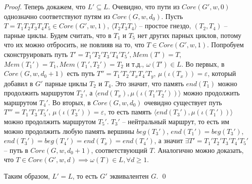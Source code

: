\begin{proof}
    Теперь докажем, что $L' \subseteq L$. 
    Очевидно, что пути из $Core(G', w, 0)$ однозначно соответствуют путям из $Core(G, w, d_0)$. 
    Пусть $T = T_1 T_2 T_3 T_4 T_5 \in Core(G', w, 1)$, 
    $\langle T_2 T_3 T_4 \rangle$ -- простое гнездо, $(T_2, T_4)$ -- парные циклы.
    Будем считать, что в $T_1$ и $T_5$ нет других парных циклов,
    потому что их можно отбросить, не повлияв на то, что $T \in Core(G',w,1)$. 
    Попробуем сконструировать путь $T' = T_1' T_2' T_3' T_4' T_5', Mem(T') = T$, 
    $Mem(T_1') = T_1, Mem(T_1', T_2') = T_2$ и т.д., $\omega(T') \in L$.
    Во первых, в $Core(G, w, d_0 + 1)$ есть путь $T'' = T_1' T_2' T_x T_4' T_y$, $\mu(\iota(T_x)) = \varepsilon$, 
    который добавил в $G'$ парные циклы $T_2$ и $T_4$.
    Это значит, что память $end(T_1)$ можно продолжить маршрутом $T_2'$, 
    а $\langle end(T_x), \mu(\iota(T_1' T_2')) \rangle$ можно продолжить маршрутом $T_4'$.
    Во вторых, в $Core(G, w, d_0)$ очевидно существует путь $T''' = T_1' T_3' T_5'$, $\mu(\iota(T_3')) = \varepsilon$, 
    то есть память $\langle end(T_3'), \mu(\iota(T_1')) \rangle$ можно продолжить маршрутом  $T_5'$. 
    $T_3'$ -- нейтральный маршрут, то есть им можно продолжить любую память вершины $beg(T_3')$, 
    $end(T_1') = beg(T_3')$, $end(T_3') = beg(T_4') = end(T_x) = end(T_4')$, а значит 
    $\exists T' = T_1' T_2' T_3' T_4' T_5'$ -- путь в $Core(G, w, d_0 + 1)$, 
    соответствующий $T$. Аналогично можно доказать, что $T \in Core(G', w, d) \implies \omega(T) \in L, \forall d \geq 1$.

    Таким образом, $L' = L$, то есть $G'$ эквивалентен $G$.
    \qed 
    

\end{proof}

\clearpage